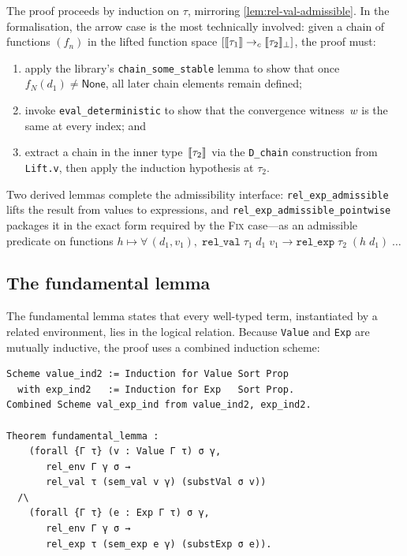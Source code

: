 \noindent
The proof proceeds by induction on $\tau$, mirroring
\cref{lem:rel-val-admissible}.  In the \Rocq{} formalisation, the
arrow case is the most technically involved: given a chain of
functions $(f_n)$ in the lifted function space
$[\llbracket \tau_1 \rrbracket \to_c \llbracket \tau_2 \rrbracket_\bot]$, the proof must:
\begin{enumerate}
  \item apply the library's \texttt{chain\_some\_stable} lemma to
    show that once $f_N(d_1) \neq \mathsf{None}$, all later chain
    elements remain defined;
  \item invoke \texttt{eval\_deterministic} to show that the
    convergence witness~$w$ is the same at every index; and
  \item extract a chain in the inner type~$\llbracket \tau_2 \rrbracket$ via
    the \texttt{D\_chain} construction from \texttt{Lift.v}, then
    apply the induction hypothesis at $\tau_2$.
\end{enumerate}
Two derived lemmas complete the admissibility interface:
\texttt{rel\_exp\_admissible} lifts the result from values to
expressions, and \texttt{rel\_exp\_admissible\_pointwise} packages it
in the exact form required by the \textsc{Fix} case---as an
admissible predicate on functions
$h \mapsto \forall\, (d_1, v_1),\;
\texttt{rel\_val}\;\tau_1\;d_1\;v_1 \to
\texttt{rel\_exp}\;\tau_2\;(h\;d_1)\;\ldots$

\subsection*{The fundamental lemma}

The fundamental lemma states that every well-typed term, instantiated
by a related environment, lies in the logical relation.  Because
\texttt{Value} and \texttt{Exp} are mutually inductive, the proof
uses a combined induction scheme:

\begin{lstlisting}[caption={Fundamental lemma statement
  (\texttt{PCF\_Adequacy.v}).},
                    label={lst:fundamental}]
Scheme value_ind2 := Induction for Value Sort Prop
  with exp_ind2   := Induction for Exp   Sort Prop.
Combined Scheme val_exp_ind from value_ind2, exp_ind2.

Theorem fundamental_lemma :
    (forall {Γ τ} (v : Value Γ τ) σ γ,
       rel_env Γ γ σ →
       rel_val τ (sem_val v γ) (substVal σ v))
  /\
    (forall {Γ τ} (e : Exp Γ τ) σ γ,
       rel_env Γ γ σ →
       rel_exp τ (sem_exp e γ) (substExp σ e)).
\end{lstlisting}

